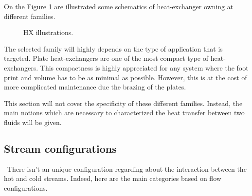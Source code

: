 On the Figure \ref{fig:C3_HX} are illustrated some schematics of heat-exchanger owning at different families.
\begin{figure}[h]
    \centering
    \hfill
    \hfill
    \caption{HX illustrations.} \label{fig:C3_HX}
\end{figure}

The selected family will highly depends on the type of application that is targeted. Plate heat-exchangers are one of the most compact type of heat-exchangers. This compactness is highly appreciated for any system where the foot print and volume has to be as minimal as possible. However, this is at the cost of more complicated maintenance due the brazing of the plates.

This section will not cover the specificity of these different families. Instead, the main notions which are necessary to characterized the heat transfer between two fluids will be given.

\subsection{Stream configurations}
\quad\ There isn't an unique configuration regarding about the interaction between the hot and cold streams. Indeed, here are the main categories based on flow configurations.


